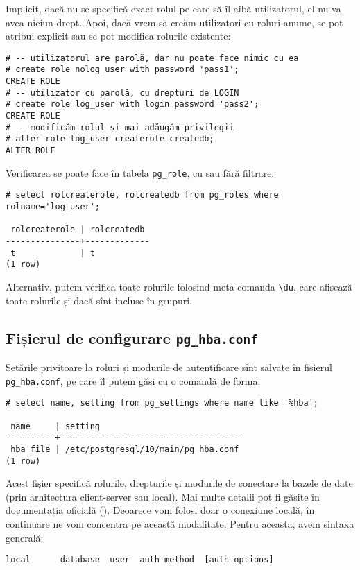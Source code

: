 Implicit, dacă nu se specifică exact rolul pe care să îl aibă utilizatorul,
el nu va avea niciun drept. Apoi, dacă vrem să creăm utilizatori cu roluri
anume, se pot atribui explicit sau se pot modifica rolurile existente:
{
  \small
\begin{verbatim}
# -- utilizatorul are parolă, dar nu poate face nimic cu ea
# create role nolog_user with password 'pass1';
CREATE ROLE
# -- utilizator cu parolă, cu drepturi de LOGIN
# create role log_user with login password 'pass2';
CREATE ROLE
# -- modificăm rolul și mai adăugăm privilegii
# alter role log_user createrole createdb;
ALTER ROLE
\end{verbatim}
}

Verificarea se poate face în tabela \texttt{pg\_role}, cu sau fără filtrare:
{
  \small
\begin{verbatim}
# select rolcreaterole, rolcreatedb from pg_roles where rolname='log_user';

 rolcreaterole | rolcreatedb 
---------------+-------------
 t             | t
(1 row)
\end{verbatim}
}

Alternativ, putem verifica toate rolurile folosind meta-comanda \texttt{\textbackslash du},
care afișează toate rolurile și dacă sînt incluse în grupuri.

\subsection{Fișierul de configurare \texttt{pg\_hba.conf}}

Setările privitoare la roluri și modurile de autentificare sînt salvate în fișierul
\texttt{pg\_hba.conf}, pe care îl putem găsi cu o comandă de forma:
{
  \small
\begin{verbatim}
# select name, setting from pg_settings where name like '%hba';

 name     | setting 
----------+-------------------------------------
 hba_file | /etc/postgresql/10/main/pg_hba.conf
(1 row)
\end{verbatim}
}

Acest fișier specifică rolurile, drepturile și modurile de conectare la bazele
de date (prin arhitectura client-server sau local). Mai multe detalii pot fi
găsite în documentația oficială (\cite{pgoff}). Deoarece vom folosi doar o conexiune
locală, în continuare ne vom concentra pe această modalitate. Pentru aceasta,
avem sintaxa generală:
{
  \small
\begin{verbatim}
local      database  user  auth-method  [auth-options]
\end{verbatim}
}

